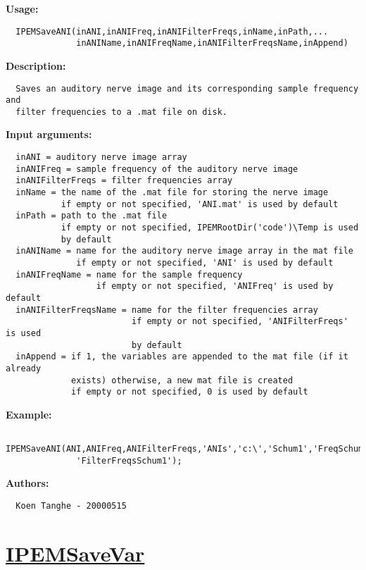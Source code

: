 \textbf{Usage:}
\begin{verbatim}  IPEMSaveANI(inANI,inANIFreq,inANIFilterFreqs,inName,inPath,...
              inANIName,inANIFreqName,inANIFilterFreqsName,inAppend)

\end{verbatim}
\textbf{Description:}
\begin{verbatim}  Saves an auditory nerve image and its corresponding sample frequency and
  filter frequencies to a .mat file on disk.

\end{verbatim}
\textbf{Input arguments:}
\begin{verbatim}  inANI = auditory nerve image array
  inANIFreq = sample frequency of the auditory nerve image
  inANIFilterFreqs = filter frequencies array
  inName = the name of the .mat file for storing the nerve image
           if empty or not specified, 'ANI.mat' is used by default
  inPath = path to the .mat file
           if empty or not specified, IPEMRootDir('code')\Temp is used
           by default
  inANIName = name for the auditory nerve image array in the mat file
              if empty or not specified, 'ANI' is used by default
  inANIFreqName = name for the sample frequency
                  if empty or not specified, 'ANIFreq' is used by default
  inANIFilterFreqsName = name for the filter frequencies array
                         if empty or not specified, 'ANIFilterFreqs' is used
                         by default
  inAppend = if 1, the variables are appended to the mat file (if it already
             exists) otherwise, a new mat file is created
             if empty or not specified, 0 is used by default

\end{verbatim}
\textbf{Example:}
\begin{verbatim}  IPEMSaveANI(ANI,ANIFreq,ANIFilterFreqs,'ANIs','c:\','Schum1','FreqSchum1',...
              'FilterFreqsSchum1');

\end{verbatim}
\textbf{Authors:}
\begin{verbatim}  Koen Tanghe - 20000515
\end{verbatim}


\newpage
\section*{\hyperlink{Concepts:IPEMSaveVar}{IPEMSaveVar}}
\hypertarget{FuncRef:IPEMSaveVar}{}

